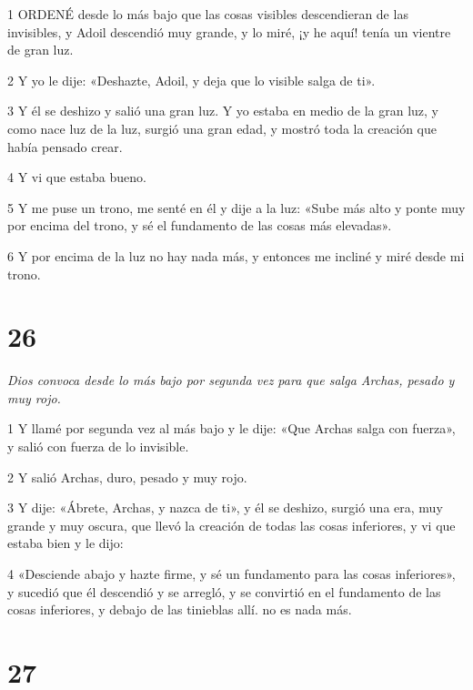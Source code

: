 \par 1 ORDENÉ desde lo más bajo que las cosas visibles descendieran de las invisibles, y Adoil descendió muy grande, y lo miré, ¡y he aquí! tenía un vientre de gran luz.

\par 2 Y yo le dije: «Deshazte, Adoil, y deja que lo visible salga de ti».

\par 3 Y él se deshizo y salió una gran luz. Y yo estaba en medio de la gran luz, y como nace luz de la luz, surgió una gran edad, y mostró toda la creación que había pensado crear.

\par 4 Y vi que estaba bueno.

\par 5 Y me puse un trono, me senté en él y dije a la luz: «Sube más alto y ponte muy por encima del trono, y sé el fundamento de las cosas más elevadas».

\par 6 Y por encima de la luz no hay nada más, y entonces me incliné y miré desde mi trono.

\chapter{26}

\par \textit{Dios convoca desde lo más bajo por segunda vez para que salga Archas, pesado y muy rojo.}

\par 1 Y llamé por segunda vez al más bajo y le dije: «Que Archas salga con fuerza», y salió con fuerza de lo invisible.

\par 2 Y salió Archas, duro, pesado y muy rojo.

\par 3 Y dije: «Ábrete, Archas, y nazca de ti», y él se deshizo, surgió una era, muy grande y muy oscura, que llevó la creación de todas las cosas inferiores, y vi que estaba bien y le dijo:

\par 4 «Desciende abajo y hazte firme, y sé un fundamento para las cosas inferiores», y sucedió que él descendió y se arregló, y se convirtió en el fundamento de las cosas inferiores, y debajo de las tinieblas allí. no es nada más.



\chapter{27}

